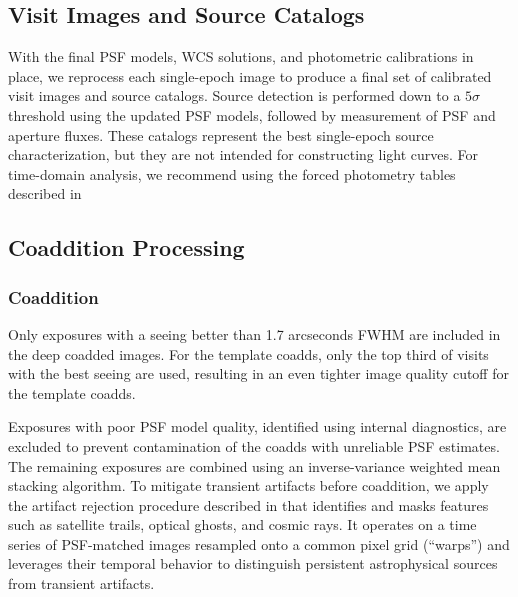 \subsection{Visit Images and Source Catalogs}
\label{sssec:visit_images_source_catalogs}
With the final \gls{PSF} models, \gls{WCS} solutions, and photometric calibrations in place, we reprocess each single-epoch image to produce a final set of calibrated visit images and source catalogs.
Source detection is performed down to a $5\sigma$ threshold using the updated \gls{PSF} models, followed by measurement of \gls{PSF} and aperture fluxes.
These catalogs represent the best single-\gls{epoch} source characterization, but they are not intended for constructing light curves.
For time-domain analysis, we recommend using the \gls{forced photometry} tables described in 

\subsection{Coaddition Processing}
\label{ssec:coadd_processing}
\subsubsection{Coaddition}
\label{ssec:coaddition}
Only exposures with a \gls{seeing} better than 1.7 arcseconds FWHM are included in the deep coadded images. For the template coadds, only the top third of visits with the best \gls{seeing} are used, resulting in an even tighter image quality cutoff for the template coadds.

Exposures with poor \gls{PSF} model quality, identified using internal diagnostics, are excluded to prevent contamination of the coadds with unreliable \gls{PSF} estimates.
The remaining exposures are combined using an inverse-variance weighted mean stacking \gls{algorithm}.
To mitigate transient artifacts before coaddition, we apply the artifact rejection procedure described in \cite{dmtn-080} that identifies and masks features such as satellite trails, optical ghosts, and cosmic rays.
It operates on a time series of \gls{PSF}-matched images resampled onto a common pixel grid (``warps'') and leverages their temporal behavior to distinguish persistent astrophysical sources from transient artifacts.

